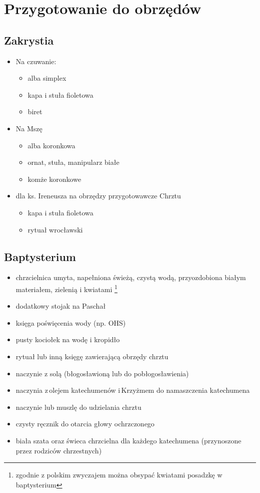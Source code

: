 \section{Przygotowanie do obrzędów}

\subsection{Zakrystia}
\begin{itemize}
	\item Na czuwanie:
	      \begin{itemize}
		      \item alba simplex
		      \item kapa i stuła {\color{violet} fioletowa}
		      \item biret
	      \end{itemize}
	\item Na Mszę
	      \begin{itemize}
		      \item alba koronkowa
		      \item ornat, stuła, manipularz białe
		      \item komże koronkowe
	      \end{itemize}
	\item dla ks. Ireneusza na obrzędzy przygotowawcze Chrztu
	      \begin{itemize}
		      \item kapa i stuła {\color{violet} fioletowa}
		      \item rytuał wrocławski
	      \end{itemize}
\end{itemize}

\subsection{Baptysterium}
\begin{itemize}
	\item chrzcielnica umyta, napełniona świeżą, czystą wodą, przyozdobiona
	      białym materiałem, zielenią i kwiatami \footnote{zgodnie z polskim zwyczajem
		      można obsypać kwiatami posadzkę w baptysterium}
	\item dodatkowy stojak na Paschał
	\item księga poświęcenia wody (np. OHS)
	\item pusty kociołek na wodę i kropidło
	\item rytuał lub inną księgę zawierającą obrzędy chrztu
	\item naczynie z solą (błogosławioną lub do pobłogosławienia)
	\item naczynia z olejem katechumenów i Krzyżmem do namaszczenia katechumena
	\item naczynie lub muszlę do udzielania chrztu
	\item czysty ręcznik do otarcia głowy ochrzczonego
	\item biała szata oraz świeca chrzcielna dla każdego katechumena
	      (przynoszone przez rodziców chrzestnych)
\end{itemize}

